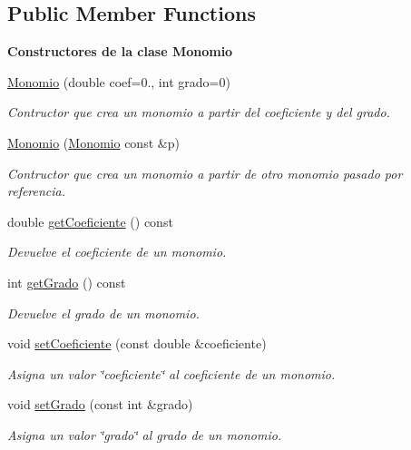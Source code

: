 \subsection*{Public Member Functions}
\begin{Indent}{\bf Constructores de la clase Monomio}\par
\begin{DoxyCompactItemize}
\item 
\hyperlink{classed_1_1Monomio_ac11803dda1ae569b9ca4771187c9610a}{Monomio} (double coef=0., int grado=0)
\begin{DoxyCompactList}\small\item\em Contructor que crea un monomio a partir del coeficiente y del grado. \end{DoxyCompactList}\item 
\hyperlink{classed_1_1Monomio_a29ea5f824f31a241f2479ec40b60f0bd}{Monomio} (\hyperlink{classed_1_1Monomio}{Monomio} const \&p)
\begin{DoxyCompactList}\small\item\em Contructor que crea un monomio a partir de otro monomio pasado por referencia. \end{DoxyCompactList}\item 
double \hyperlink{classed_1_1Monomio_a1fa653597b00d3ebf69b26d84949051a}{get\-Coeficiente} () const 
\begin{DoxyCompactList}\small\item\em Devuelve el coeficiente de un monomio. \end{DoxyCompactList}\item 
int \hyperlink{classed_1_1Monomio_a22fd67c971fbbc239e882a0adc0f3ef2}{get\-Grado} () const 
\begin{DoxyCompactList}\small\item\em Devuelve el grado de un monomio. \end{DoxyCompactList}\item 
void \hyperlink{classed_1_1Monomio_a259fcdd7c96549aa053ffb4ac69af07f}{set\-Coeficiente} (const double \&coeficiente)
\begin{DoxyCompactList}\small\item\em Asigna un valor \char`\"{}coeficiente\char`\"{} al coeficiente de un monomio. \end{DoxyCompactList}\item 
void \hyperlink{classed_1_1Monomio_ae5ff9fdeb412ee9197f5395942d8ef47}{set\-Grado} (const int \&grado)
\begin{DoxyCompactList}\small\item\em Asigna un valor \char`\"{}grado\char`\"{} al grado de un monomio. \end{DoxyCompactList}\item 

\end{DoxyCompactItemize}
\end{Indent}
